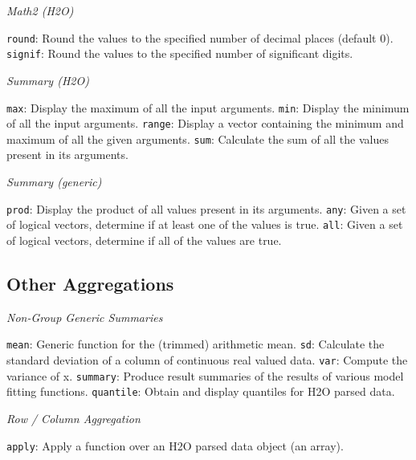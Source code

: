 \documentclass[11pt]{article}
\begin{document}
{{\emph{Math2 (H2O)}\par
{\texttt{round}}: Round the values to the specified number of decimal places (default 0). \newline
{\texttt{signif}}: Round the values to the specified number of significant digits.\newline

\emph{Summary (H2O)}\par
{\texttt{max}}: Display the maximum of all the input arguments. \newline
{\texttt{min}}: Display the minimum of all the input arguments. \newline
{\texttt{range}}: Display a vector containing the minimum and maximum of all the given arguments. \newline
{\texttt{sum}}: Calculate the sum of all the values present in its arguments.\newline

\emph{Summary (generic)}\par
{\texttt{prod}}: Display the product of all values present in its arguments. \newline
{\texttt{any}}: Given a set of logical vectors, determine if at least one of the values is true. \newline
{\texttt{all}}: Given a set of logical vectors, determine if all of the values are true.\newline

\subsection{Other Aggregations}

\emph{Non-Group Generic Summaries}\par
{\texttt{mean}}: Generic function for the (trimmed) arithmetic mean. \newline
{\texttt{sd}}: Calculate the standard deviation of a column of continuous real valued data. \newline
{\texttt{var}}: Compute the variance of x.\newline
{\texttt{summary}}: Produce result summaries of the results of various model fitting functions. \newline
{\texttt{quantile}}: Obtain and display quantiles for H2O parsed data.\newline

\emph{Row / Column Aggregation}\par
{\texttt{apply}: Apply a function over an H2O parsed data object (an array).\newline

}}}
\end{document}
